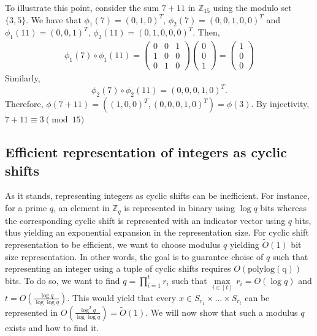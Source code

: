 To illustrate this point, consider the sum $7 + 11$ in $\mathbb{Z}_{15}$ using the modulo set $\{3,5\}$. We have that $\phi_1(7) = (0,1,0)^T$, $\phi_2(7) = (0,0,1,0,0)^T$ and $\phi_1(11) = (0,0,1)^T$, $\phi_2(11) = (0,1,0,0,0)^T$. Then, 
\begin{equation*}
    \begin{aligned}
        \phi_1(7) \circ \phi_1(11) = \begin{pmatrix}
            0 & 0 & 1 \\
            1 & 0 & 0 \\
            0 & 1 & 0
        \end{pmatrix} \begin{pmatrix}
            0 \\
            0 \\
            1
        \end{pmatrix} = \begin{pmatrix} 
            1 \\
            0 \\
            0
        \end{pmatrix}
    \end{aligned}
\end{equation*}
Similarly, 
\begin{equation*}
    \phi_2(7) \circ \phi_2(11) = (0,0,0,1,0)^T. 
\end{equation*}
Therefore, $\phi(7 + 11) = ((1,0,0)^T, (0,0,0,1,0)^T) = \phi(3)$. By injectivity, $7 + 11 \equiv 3 \pmod{15}$
\subsection*{Efficient representation of integers as cyclic shifts}\label{sec:representing_q}
As it stands, representing integers as cyclic shifts can be inefficient. For instance, for a prime $q$, an element in $\mathbb{Z}_q$ is represented in binary using $\log q$ bits whereas the corresponding cyclic shift is represented with an indicator vector using $q$ bits, thus yielding an exponential expansion in the representation size. For cyclic shift representation to be efficient, we want to choose modulus $q$ yielding $\tilde{O}(1)$ bit size representation. In other words, the goal is to guarantee choise of $q$ such that representing an integer using a tuple of cyclic shifts requires $O(\operatorname{polylog(q)})$ bits. To do so, we want to find $q = \prod_{i=1}^t r_i$ such that $\underset{i \in [t]}{\max} \ r_i = O(\log q)$ and $t = O(\frac{\log q}{\log \log q})$. This would yield that every $x \in S_{r_1} \times \dots \times S_{r_t}$ can be represented in $O(\frac{\log^2q}{\log \log q}) = \tilde{O}(1)$. We will now show that such a modulus $q$ exists and how to find it.

